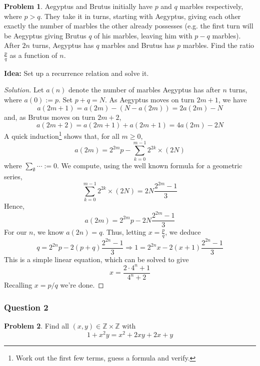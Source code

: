\documentclass[11pt]{article}
\theoremstyle{definition}
\newtheorem*{problem}{Problem}
\begin{document}
\begin{problem}
  Aegyptus and Brutus initially have $p$ and $q$ marbles respectively, where $p > q$. They take it in turns, starting 
  with Aegyptus, giving each other exactly the number of marbles the other already possesses (e.g. the first turn 
  will be Aegyptus giving Brutus $q$ of his marbles, leaving him with $p-q$ marbles). After $2n$ turns, Aegyptus
  has $q$ marbles and Brutus has $p$ marbles. Find the ratio $\frac{p}{q}$ as a function of $n$. 
\end{problem}

{\bf Idea:} Set up a recurrence relation and solve it.

\begin{proof}[Solution]
  Let $a(n)$ denote the number of marbles Aegyptus has after $n$ turns, where $a(0) := p$. Set $p + q = N$. As 
  Aegyptus moves on turn $2m+1$, we have
  \[a(2m + 1) = a(2m) - (N - a(2m)) = 2a(2m) - N\]
  and, as Brutus moves on turn $2m+2$,
  \[a(2m + 2) = a(2m + 1) + a(2m + 1) = 4a(2m) - 2N\]
  A quick induction\footnote{Work out the first few terms, guess a formula and verify.} shows that, for all $m \geq 0$,
  \[a(2m) = 2^{2m}p - \sum_{k=0}^{m-1}2^{2k} \times (2N)\]
  where $\sum_{\emptyset} \cdots := 0$. We compute, using the well known formula for a geometric series, 
  \[\sum_{k=0}^{m-1}2^{2k} \times (2N) = 2N \frac{2^{2m} - 1}{3}\]
  Hence, 
  \[a(2m) = 2^{2m}p - 2N \frac{2^{2m} - 1}{3}\]
  For our $n$, we know $a(2n) = q$. Thus, letting $x = \frac{p}{q}$, we deduce
  \[q = 2^{2n}p - 2(p + q)\frac{2^{2n} - 1}{3} \Longrightarrow 1 = 2^{2n}x - 2(x + 1)\frac{2^{2n} - 1}{3}\]
  This is a simple linear equation, which can be solved to give 
  \[x = \frac{2 \cdot 4^n + 1}{4^n + 2}\]
  Recalling $x = p/q$ we're done. 
\end{proof}

\newpage 

\subsubsection{Question 2}

\begin{problem}
  Find all $(x, y) \in \mathbb{Z} \times \mathbb{Z}$ with \[1 + x^2y = x^2 + 2xy + 2x + y\]
\end{problem}
\end{document}

